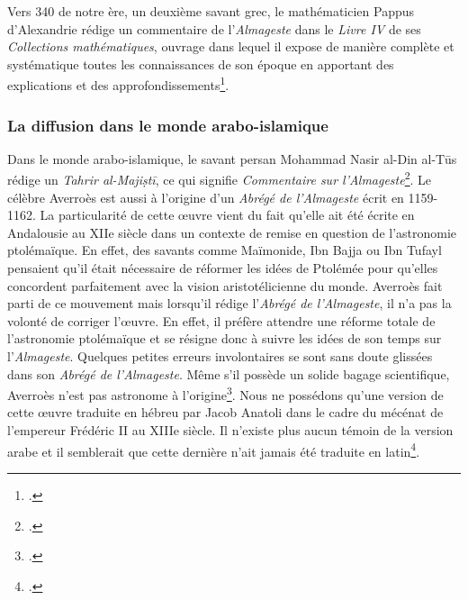 Vers 340 de notre ère, un deuxième savant grec, le mathématicien Pappus d'Alexandrie rédige un commentaire de l'\textit{Almageste} dans le \textit{Livre IV} de ses \textit{Collections mathématiques}, ouvrage dans lequel il expose de manière complète et systématique toutes les connaissances de son époque en apportant des explications et des approfondissements\footcite{meyerPAPPUS1999}.


\subsubsection{La diffusion dans le monde arabo-islamique}
Dans le monde arabo-islamique, le savant persan Mohammad Nasir al-Din al-Tūs rédige un \textit{Tahrir al-Majiṣtī}, ce qui signifie \textit{Commentaire sur l'Almageste}\footcite{universalisMOHAMMADNASIRALDIN2008}. 
Le célèbre  Averroès est aussi à l'origine d'un \textit{Abrégé de l'Almageste} écrit en 1159-1162. La particularité de cette œuvre vient du fait qu'elle ait été écrite en Andalousie au XIIe siècle dans un contexte de remise en question de l'astronomie ptolémaïque. En effet, des savants comme Maïmonide, Ibn Bajja ou Ibn Tufayl pensaient qu'il était nécessaire de réformer les idées de Ptolémée pour qu'elles concordent parfaitement avec la vision aristotélicienne du monde. Averroès fait parti de ce mouvement mais lorsqu'il rédige l'\textit{Abrégé de l'Almageste}, il n'a pas la volonté de corriger l'œuvre. En effet, il préfère attendre une réforme totale de l'astronomie ptolémaïque et se résigne donc à suivre les idées de son temps sur l'\textit{Almageste}.
Quelques petites erreurs involontaires se sont sans doute glissées dans son \textit{Abrégé de l'Almageste}. Même s'il possède un solide bagage scientifique, Averroès n'est pas astronome à l'origine\footcite{layAverroesAbregeDastronomie1998}. Nous ne possédons qu'une version de cette œuvre traduite en hébreu par Jacob Anatoli dans le cadre du mécénat de l'empereur Frédéric II au XIIIe siècle. Il n'existe plus aucun témoin de la version arabe et il semblerait que cette dernière n'ait jamais été traduite en latin\footcite{layAverroesHebraicusInedit2005}.

